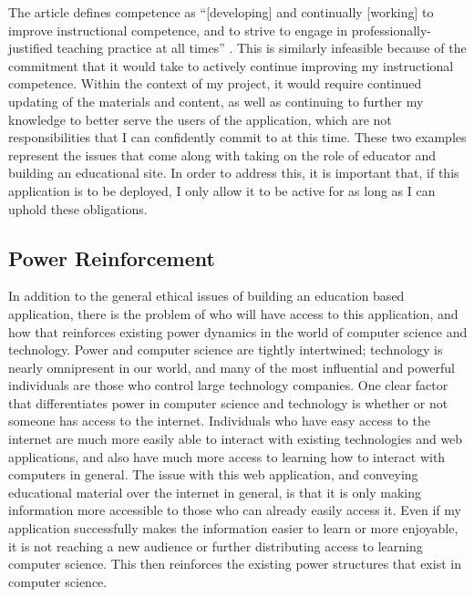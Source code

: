 \documentclass[10pt,twocolumn]{article}
\begin{document}
The article defines competence as “[developing] and continually [working] to improve instructional competence, and to 
strive to engage in professionally-justified teaching practice at all times” \cite{MichiganEducation}. This is 
similarly infeasible because of the commitment that it would take to actively continue improving my instructional 
competence. Within the context of my project, it would require continued updating of the materials and content, as well 
as continuing to further my knowledge to better serve the users of the application, which are not responsibilities that 
I can confidently commit to at this time. These two examples represent the issues that come along with taking on the 
role of educator and building an educational site. In order to address this, it is important that, if this application 
is to be deployed, I only allow it to be active for as long as I can uphold these obligations.


\subsection{Power Reinforcement}

In addition to the general ethical issues of building an education based application, there is the problem of who will 
have access to this application, and how that reinforces existing power dynamics in the world of computer science and 
technology. Power and computer science are tightly intertwined; technology is nearly omnipresent in our world, and many 
of the most influential and powerful individuals are those who control large technology companies. One clear factor that 
differentiates power in computer science and technology is whether or not someone has 
access to the internet. Individuals who have easy access to the internet are much more easily able to interact with 
existing technologies and web applications, and also have much more access to learning how to interact with computers in 
general. The issue with this web application, and conveying educational material over the internet in general, is that 
it is only making information more accessible to those who can already easily access it. Even if my application successfully makes 
the information easier to learn 
or more enjoyable, it is not reaching a new audience or further distributing access to learning computer science. This 
then reinforces the existing power structures that exist in computer science. 
\end{document}
